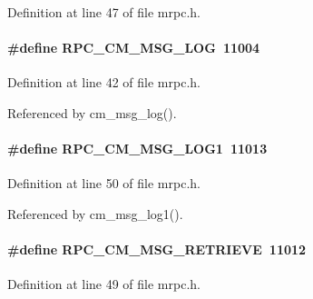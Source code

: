 Definition at line 47 of file mrpc.h.
\paragraph[{RPC\_\-CM\_\-MSG\_\-LOG}]{\setlength{\rightskip}{0pt plus 5cm}\#define RPC\_\-CM\_\-MSG\_\-LOG~11004}\hfill\label{group__mrpcdefineh_gacf43c40575a236cae5e83a9380f964e7}

\begin{DoxyItemize}
\item 
\end{DoxyItemize}

Definition at line 42 of file mrpc.h.

Referenced by cm\_\-msg\_\-log().
\paragraph[{RPC\_\-CM\_\-MSG\_\-LOG1}]{\setlength{\rightskip}{0pt plus 5cm}\#define RPC\_\-CM\_\-MSG\_\-LOG1~11013}\hfill\label{group__mrpcdefineh_gad4f6e60f24b227405abd4e5394693092}

\begin{DoxyItemize}
\item 
\end{DoxyItemize}

Definition at line 50 of file mrpc.h.

Referenced by cm\_\-msg\_\-log1().
\paragraph[{RPC\_\-CM\_\-MSG\_\-RETRIEVE}]{\setlength{\rightskip}{0pt plus 5cm}\#define RPC\_\-CM\_\-MSG\_\-RETRIEVE~11012}\hfill\label{group__mrpcdefineh_gada6c0b63689032378b7ef710ec5793c2}

\begin{DoxyItemize}
\item 
\end{DoxyItemize}

Definition at line 49 of file mrpc.h.

